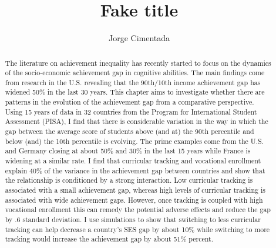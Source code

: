\documentclass[Royal,times,sageh]{sagej}
\begin{document}
\title{Fake title}


\author{Jorge Cimentada}




\begin{abstract}
The literature on achievement inequality has recently started to focus
on the dynamics of the socio-economic achievement gap in cognitive
abilities. The main findings come from research in the U.S. revealing
that the 90th/10th income achievement gap has widened 50\% in the last
30 years. This chapter aims to investigate whether there are patterns in
the evolution of the achievement gap from a comparative perspective.
Using 15 years of data in 32 countries from the Program for
International Student Assessment (PISA), I find that there is
considerable variation in the way in which the gap between the average
score of students above (and at) the 90th percentile and below (and) the
10th percentile is evolving. The prime examples come from the U.S. and
Germany closing at about 50\% and 30\% in the last 15 years while France
is widening at a similar rate. I find that curricular tracking and
vocational enrollment explain 40\% of the variance in the achievement
gap between countries and show that the relationship is conditioned by a
strong interaction. Low curricular tracking is associated with a small
achievement gap, whereas high levels of curricular tracking is
associated with wide achievement gaps. However, once tracking is coupled
with high vocational enrollment this can remedy the potential adverse
effects and reduce the gap by .6 standard deviation. I use simulations
to show that switching to less curricular tracking can help decrease a
country's SES gap by about 10\% while switching to more tracking would
increase the achievement gap by about 51\% percent.
\end{abstract}


\maketitle
\end{document}
